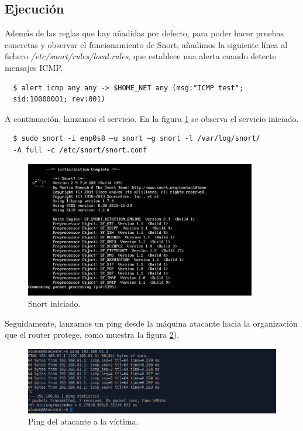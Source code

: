 \documentclass[a4,12pt,onecolum]{article}
\begin{document}
\subsection{Ejecución}

Además de las reglas que hay añadidas por defecto, para poder hacer pruebas concretas y observar el funcionamiento de Snort, añadimos la siguiente línea al fichero \emph{/etc/snort/rules/local.rules}, que establece una alerta cuando detecte mensajes ICMP.

\begin{verbatim}
  $ alert icmp any any -> $HOME_NET any (msg:"ICMP test";
  sid:10000001; rev:001)
\end{verbatim}

A continuación, lanzamos el servicio. En la figura \ref{fig:snort2} se observa el servicio iniciado.

\begin{verbatim}
  $ sudo snort -i enp0s8 –u snort –g snort -l /var/log/snort/
  -A full -c /etc/snort/snort.conf
\end{verbatim}

\begin{figure}[H]
\centering
\includegraphics[width=0.9\textwidth]{./images/SnortInicio.png}
\caption{Snort iniciado.}
\label{fig:snort2}
\end{figure}

Seguidamente, lanzamos un ping desde la máquina atacante hacia la organización que el router protege, como muestra la figura \ref{fig:snort3}).

\begin{figure}[H]
\centering
\includegraphics[width=1.0\textwidth]{./images/SnortPing.png}
\caption{Ping del atacante a la víctima.}
\label{fig:snort3}
\end{figure}
\end{document}
